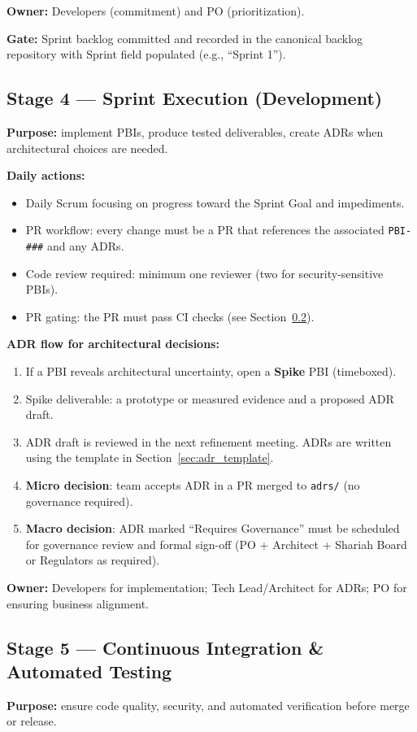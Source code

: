 \documentclass[11pt,a4paper]{article}
\begin{document}
\textbf{Owner:} Developers (commitment) and PO (prioritization).

\textbf{Gate:} Sprint backlog committed and recorded in the canonical backlog repository with Sprint field populated (e.g., ``Sprint 1'').

\subsection{Stage 4 — Sprint Execution (Development)}
\textbf{Purpose:} implement PBIs, produce tested deliverables, create ADRs when architectural choices are needed.

\textbf{Daily actions:}
\begin{itemize}
  \item Daily Scrum focusing on progress toward the Sprint Goal and impediments.
  \item PR workflow: every change must be a PR that references the associated \texttt{PBI-\#\#\#} and any ADRs.
  \item Code review required: minimum one reviewer (two for security-sensitive PBIs).
  \item PR gating: the PR must pass CI checks (see Section~\ref{sec:ci_cd_gating}).
\end{itemize}

\textbf{ADR flow for architectural decisions:}
\begin{enumerate}
  \item If a PBI reveals architectural uncertainty, open a \textbf{Spike} PBI (timeboxed).
  \item Spike deliverable: a prototype or measured evidence and a proposed ADR draft.
  \item ADR draft is reviewed in the next refinement meeting. ADRs are written using the template in Section~\ref{sec:adr_template}.
  \item \textbf{Micro decision}: team accepts ADR in a PR merged to \texttt{adrs/} (no governance required).
  \item \textbf{Macro decision}: ADR marked ``Requires Governance'' must be scheduled for governance review and formal sign-off (PO + Architect + Shariah Board or Regulators as required).
\end{enumerate}

\textbf{Owner:} Developers for implementation; Tech Lead/Architect for ADRs; PO for ensuring business alignment.

\subsection{Stage 5 — Continuous Integration \& Automated Testing}\label{sec:ci_cd_gating}
\textbf{Purpose:} ensure code quality, security, and automated verification before merge or release.
\end{document}
